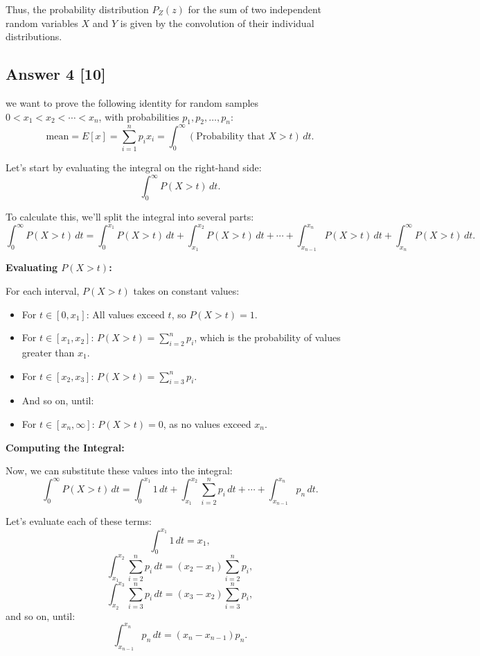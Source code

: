\documentclass[12pt]{article}
\begin{document}
Thus, the probability distribution \( P_Z(z) \) for the sum of two independent random variables \( X \) and \( Y \) is given by the convolution of their individual distributions.

\subsection*{Answer 4 [10]}
we want to prove the following identity for random samples \( 0 < x_1 < x_2 < \cdots < x_n \), with probabilities \( p_1, p_2, \dots, p_n \):
\[
\text{mean} = E[x] = \sum_{i=1}^{n} p_i x_i = \int_0^\infty \left( \text{Probability that } X > t \right) \, dt.
\]

Let's start by evaluating the integral on the right-hand side:
\[
\int_0^\infty P(X > t) \, dt.
\]

To calculate this, we'll split the integral into several parts:
\[
\int_0^\infty P(X > t) \, dt = \int_0^{x_1} P(X > t) \, dt + \int_{x_1}^{x_2} P(X > t) \, dt + \cdots + \int_{x_{n-1}}^{x_n} P(X > t) \, dt + \int_{x_n}^\infty P(X > t) \, dt.
\]

\textbf{Evaluating \( P(X > t) \):}

For each interval, \( P(X > t) \) takes on constant values:
\begin{itemize}
    \item For \( t \in [0, x_1] \): All values exceed \( t \), so \( P(X > t) = 1 \).
    \item For \( t \in [x_1, x_2] \): \( P(X > t) = \sum_{i=2}^n p_i \), which is the probability of values greater than \( x_1 \).
    \item For \( t \in [x_2, x_3] \): \( P(X > t) = \sum_{i=3}^n p_i \).
    \item And so on, until:
    \item For \( t \in [x_n, \infty] \): \( P(X > t) = 0 \), as no values exceed \( x_n \).
\end{itemize}

\textbf{Computing the Integral:}

Now, we can substitute these values into the integral:
\[
\int_0^\infty P(X > t) \, dt = \int_0^{x_1} 1 \, dt + \int_{x_1}^{x_2} \sum_{i=2}^n p_i \, dt + \cdots + \int_{x_{n-1}}^{x_n} p_n \, dt.
\]

Let's evaluate each of these terms:
\[
\int_0^{x_1} 1 \, dt = x_1,
\]
\[
\int_{x_1}^{x_2} \sum_{i=2}^n p_i \, dt = (x_2 - x_1) \sum_{i=2}^n p_i,
\]
\[
\int_{x_2}^{x_3} \sum_{i=3}^n p_i \, dt = (x_3 - x_2) \sum_{i=3}^n p_i,
\]
and so on, until:
\[
\int_{x_{n-1}}^{x_n} p_n \, dt = (x_n - x_{n-1}) p_n.
\]
\end{document}
